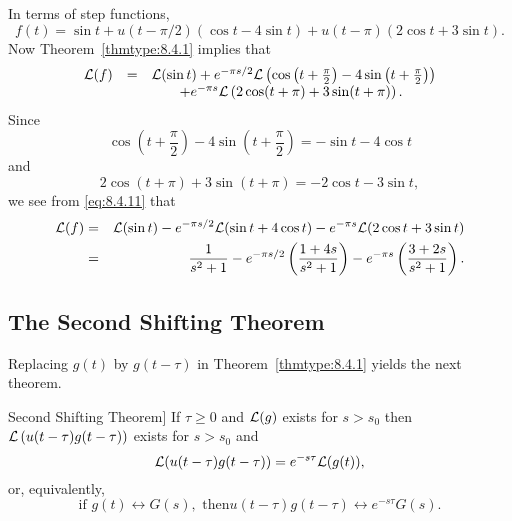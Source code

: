 \documentclass{ximera}
\begin{document}
\begin{example}
\begin{explanation}
In terms of step functions,
$$
f(t)=\sin t+u(t-\pi/2) (\cos t-4\sin t)+u(t-\pi) (2
\cos t+3\sin t).
$$
Now Theorem~\ref{thmtype:8.4.1} implies that
\begin{equation}\label{eq:8.4.11}
\begin{array}{ccl}
{\cal L}(f)&=&{\cal L}(\sin t)+e^{-\pi s/2}{\cal L}
\left(\cos\left(t+\frac{\pi}{2}\right)-4\sin\left(t+\frac{\pi}{2}\right)\right)\\
&&\qquad+e^{-\pi s}{\cal L}\left(2\cos(t+\pi)+3\sin(t+\pi)\right).
\end{array}
\end{equation}
Since
$$
\cos\left(t+\frac{\pi}{2}\right)-4\sin\left(t+\frac{\pi}{2}\right)=-\sin t-4\cos t
$$
and
$$
 2\cos (t+\pi)+3\sin (t+\pi)=-2\cos t-3\sin t,
$$
we see from \eqref{eq:8.4.11} that
\begin{eqnarray*}
{\cal L}(f)&=&{\cal L}(\sin t)-e^{-\pi s/2}{\cal L}(\sin t+4\cos t)
-e^{-\pi s}{\cal L}(2\cos t+3\sin t)\\
&=&\frac{1}{s^2+1}-e^{-\pi s/2} \left(\frac{1+4s}{s^2+1}\right)
-e^{-\pi s}\left(\frac{3+2s}{s^2+1}\right).
\end{eqnarray*}
\end{explanation}
\end{example}




\subsection*{The Second Shifting Theorem}

Replacing $g(t)$ by $g(t-\tau)$ in Theorem~\ref{thmtype:8.4.1}
yields the next theorem.

\begin{theorem}Second Shifting
Theorem]\label{thmtype:8.4.2} If
 $\tau\geq 0$ and ${\cal L}(g)$ exists for $s>s_0$
then  ${\cal L}\left(u(t-\tau)g(t-\tau)\right)$ exists for $s>s_0$ and
$$
{\cal L}(u(t-\tau)g(t-\tau))=e^{-s\tau}{\cal L}(g(t)),
$$
or, equivalently,
\begin{equation}\label{eq:8.4.12}
\mbox{if } g(t)\leftrightarrow G(s),\mbox{ then
}u(t-\tau)g(t-\tau)\leftrightarrow e^{-s\tau}G(s).
\end{equation}
\end{theorem}
\end{document}
